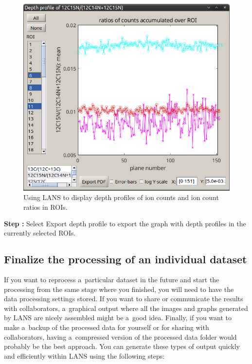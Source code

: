 \documentclass[a4paper, 11pt]{article}
\newcommand{\lans}[1]{{\color{magenta}#1}}
\newcounter{step}
\newcommand\s{\addtocounter{step}{1}\vskip5pt\noindent\textbf{Step \thestep:}{ }}
\begin{document}
\begin{figure}[!ht]
\centering
\includegraphics[scale=0.4]{figs3/LANS-depth-profiles}
\caption{\label{fig:depth-profiles}%
Using LANS to display depth profiles of ion counts and ion count ratios in ROIs.}
\end{figure}

\s Select \lans{Export depth profile} to export the graph with depth profiles in the currently selected ROIs.


\subsection{Finalize the processing of an individual dataset}
\label{sec:final-steps}
\setcounter{step}{0}

If you want to reprocess a~particular dataset in the future and start the processing from the same stage where you finished, you will need to have the data processing settings stored. If you want to share or communicate the results with collaborators, a~graphical output where all the images and graphs generated by LANS are nicely assembled might be a~good idea. Finally, if you want to make a~backup of the processed data for yourself or for sharing with collaborators, having a~compressed version of the processed data folder would probably be the best approach. You can generate these types of output quickly and efficiently within LANS using the following steps:
\end{document}
